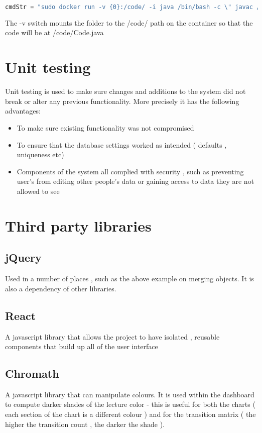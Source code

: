 \begin{lstlisting}[breaklines,language=Typescript,frame=single,basicstyle=\ttfamily,
    stringstyle=\color{red},
    keywordstyle=\color{blue}]
cmdStr = "sudo docker run -v {0}:/code/ -i java /bin/bash -c \" javac /code/Code.java;cd /code/;java Code\"".format(folder)
\end{lstlisting}

The -v switch mounts the folder to the /code/ path on the container so that the code will be at /code/Code.java



\section{Unit testing}
Unit testing is used to make sure changes and additions to the system did not break or alter any previous functionality. More precisely it has the following advantages:
\begin{itemize}
	\item To make sure existing functionality was not compromised
	\item To ensure that the database settings worked as intended ( defaults , uniqueness etc)
	\item Components of the system all complied with security , such as preventing user's from editing other people's data or gaining access to data they are not allowed to see
\end{itemize}




\section{Third party libraries} \label{libs}

\subsection{jQuery}
Used in a number of places , such as the above example on merging objects. It is also a dependency of other libraries.

\subsection{React}
A javascript library that allows the project to have isolated , reusable components that build up all of the user interface

\subsection{Chromath} 
A javascript library that can manipulate colours. It is used within the dashboard to compute darker shades of the lecture color - this is useful for both the charts ( each section of the chart is a different colour ) and for the transition matrix ( the higher the transition count , the darker the shade ).

